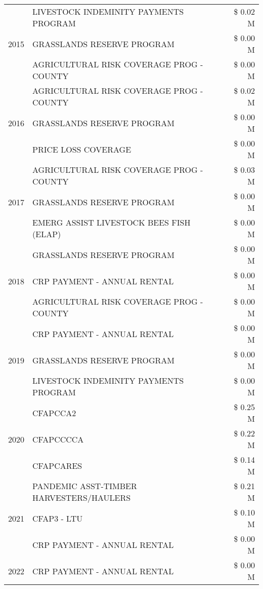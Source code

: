 \begin{tabular}{llr}
\cline{1-3}
\multirow[t]{3}{*}{2015} & LIVESTOCK INDEMINITY PAYMENTS PROGRAM & \$ 0.02 M \\
 & GRASSLANDS RESERVE PROGRAM & \$ 0.00 M \\
 & AGRICULTURAL RISK COVERAGE PROG - COUNTY & \$ 0.00 M \\
\cline{1-3}
\multirow[t]{3}{*}{2016} & AGRICULTURAL RISK COVERAGE PROG - COUNTY & \$ 0.02 M \\
 & GRASSLANDS RESERVE PROGRAM & \$ 0.00 M \\
 & PRICE LOSS COVERAGE & \$ 0.00 M \\
\cline{1-3}
\multirow[t]{3}{*}{2017} & AGRICULTURAL RISK COVERAGE PROG - COUNTY & \$ 0.03 M \\
 & GRASSLANDS RESERVE PROGRAM & \$ 0.00 M \\
 & EMERG ASSIST LIVESTOCK BEES FISH (ELAP) & \$ 0.00 M \\
\cline{1-3}
\multirow[t]{3}{*}{2018} & GRASSLANDS RESERVE PROGRAM & \$ 0.00 M \\
 & CRP PAYMENT - ANNUAL RENTAL & \$ 0.00 M \\
 & AGRICULTURAL RISK COVERAGE PROG - COUNTY & \$ 0.00 M \\
\cline{1-3}
\multirow[t]{3}{*}{2019} & CRP PAYMENT - ANNUAL RENTAL & \$ 0.00 M \\
 & GRASSLANDS RESERVE PROGRAM & \$ 0.00 M \\
 & LIVESTOCK INDEMINITY PAYMENTS PROGRAM & \$ 0.00 M \\
\cline{1-3}
\multirow[t]{3}{*}{2020} & CFAPCCA2 & \$ 0.25 M \\
 & CFAPCCCCA & \$ 0.22 M \\
 & CFAPCARES & \$ 0.14 M \\
\cline{1-3}
\multirow[t]{3}{*}{2021} & PANDEMIC ASST-TIMBER HARVESTERS/HAULERS & \$ 0.21 M \\
 & CFAP3 - LTU & \$ 0.10 M \\
 & CRP PAYMENT - ANNUAL RENTAL & \$ 0.00 M \\
\cline{1-3}
2022 & CRP PAYMENT - ANNUAL RENTAL & \$ 0.00 M \\
\cline{1-3}
\bottomrule
\end{tabular}
